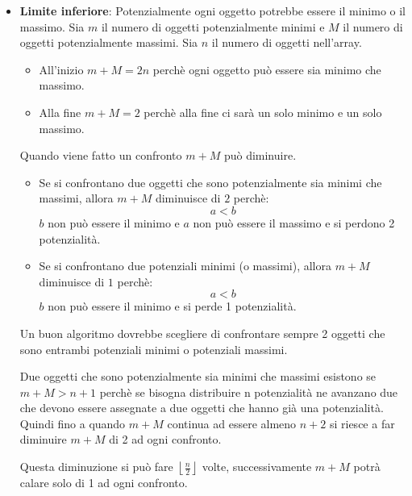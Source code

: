 \documentclass[a4paper]{article}
\begin{document}
\begin{itemize}
  \item \textbf{Limite inferiore}: Potenzialmente ogni oggetto potrebbe essere il minimo
    o il massimo. Sia \( m \) il numero di oggetti potenzialmente minimi e \( M \) il
    numero di oggetti potenzialmente massimi. Sia \( n \) il numero di oggetti nell'array.
    \begin{itemize}
      \item All'inizio \( m+M = 2n \) perchè ogni oggetto può essere sia minimo che 
        massimo.
      \item Alla fine \( m+M = 2 \) perchè alla fine ci sarà un solo minimo e un solo 
        massimo.
    \end{itemize}
    Quando viene fatto un confronto \( m+M \) può diminuire.
    \begin{itemize}
      \item Se si confrontano due oggetti che sono potenzialmente sia minimi che massimi,
        allora \( m+M \) diminuisce di \( 2 \) perchè:
        \[
          a < b
        \] 
        \( b \) non può essere il minimo e \( a \) non può essere il massimo e si perdono
        2 potenzialità.

      \item Se si confrontano due potenziali minimi (o massimi), allora \( m+M \) 
        diminuisce di \( 1 \) perchè:
        \[
          a < b
        \]
        \( b \) non può essere il minimo e si perde 1 potenzialità.
    \end{itemize}
    Un buon algoritmo dovrebbe scegliere di confrontare sempre 2 oggetti che sono
    entrambi potenziali minimi o potenziali massimi.

    \vspace{1em}
    \noindent
    Due oggetti che sono potenzialmente sia minimi che massimi esistono
    se \( m+M > n+1 \) perchè se bisogna distribuire n potenzialità ne avanzano
    due che devono essere assegnate a due oggetti che hanno già una potenzialità.
    Quindi fino a quando \( m+M \) continua ad essere almeno \( n+2 \) si riesce a
    far diminuire \( m+M \) di 2 ad ogni confronto.

    Questa diminuzione si può fare \( \left\lfloor \frac{n}{2} \right\rfloor \) volte,
    successivamente \( m+M \) potrà calare solo di 1 ad ogni confronto.
    

\end{itemize}
\end{document}
